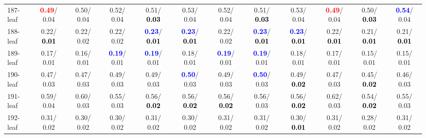 \begin{table}[h]
\begin{center}
{\begin{tabular}{lc|c|c|c|c|c|c|c|c|c|c}
187-leaf & \textcolor{red}{\textbf{  0.49}}/  0.04 &   0.50/  0.04 &   0.52/  0.04 &   0.51/\textcolor{black}{\textbf{  0.03}} &   0.53/  0.04 &   0.52/  0.04 &   0.51/\textcolor{black}{\textbf{  0.03}} &   0.53/  0.04 & \textcolor{red}{\textbf{  0.49}}/  0.04 &   0.50/\textcolor{black}{\textbf{  0.03}} & \textcolor{blue}{\textbf{  0.54}}/  0.04 \\
188-leaf &   0.22/\textcolor{black}{\textbf{  0.01}} &   0.22/  0.02 &   0.22/  0.02 & \textcolor{blue}{\textbf{  0.23}}/\textcolor{black}{\textbf{  0.01}} & \textcolor{blue}{\textbf{  0.23}}/\textcolor{black}{\textbf{  0.01}} &   0.22/  0.02 & \textcolor{blue}{\textbf{  0.23}}/\textcolor{black}{\textbf{  0.01}} & \textcolor{blue}{\textbf{  0.23}}/\textcolor{black}{\textbf{  0.01}} &   0.22/\textcolor{black}{\textbf{  0.01}} &   0.21/\textcolor{black}{\textbf{  0.01}} &   0.21/\textcolor{black}{\textbf{  0.01}} \\ \hline
189-leaf &   0.17/  0.01 &   0.16/  0.01 & \textcolor{blue}{\textbf{  0.19}}/  0.01 & \textcolor{blue}{\textbf{  0.19}}/  0.01 &   0.18/  0.01 & \textcolor{blue}{\textbf{  0.19}}/  0.01 & \textcolor{blue}{\textbf{  0.19}}/  0.01 &   0.18/  0.01 &   0.17/  0.01 &   0.15/  0.01 &   0.15/  0.01 \\
190-leaf &   0.47/  0.03 &   0.47/  0.03 &   0.49/  0.03 &   0.49/  0.03 & \textcolor{blue}{\textbf{  0.50}}/  0.03 &   0.49/  0.03 & \textcolor{blue}{\textbf{  0.50}}/  0.03 &   0.49/\textcolor{black}{\textbf{  0.02}} &   0.47/  0.03 &   0.45/\textcolor{black}{\textbf{  0.02}} &   0.46/  0.03 \\
191-leaf &   0.59/  0.04 &   0.60/  0.03 &   0.55/  0.03 &   0.56/\textcolor{black}{\textbf{  0.02}} &   0.56/\textcolor{black}{\textbf{  0.02}} &   0.56/\textcolor{black}{\textbf{  0.02}} &   0.56/  0.03 &   0.56/\textcolor{black}{\textbf{  0.02}} &   0.62/  0.03 &   0.54/\textcolor{black}{\textbf{  0.02}} &   0.55/  0.03 \\
192-leaf &   0.31/  0.02 &   0.30/  0.02 &   0.30/  0.02 &   0.31/  0.02 &   0.30/  0.02 &   0.31/  0.02 &   0.31/  0.02 &   0.30/\textcolor{black}{\textbf{  0.01}} &   0.31/  0.02 &   0.28/  0.02 &   0.31/  0.02 \\\end{tabular}}\label{stratsALCKappa5Allalla}
\end{center}
\end{table}
